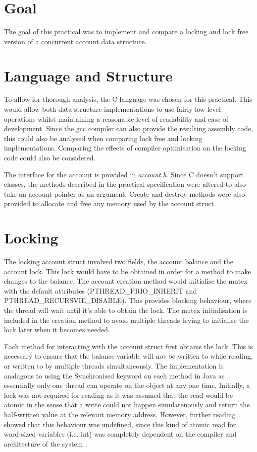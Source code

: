 \documentclass[12pt]{article}
\begin{document}
\part*{Goal}

The goal of this practical was to implement and compare a locking and lock free version of a concurrent account data structure.

\part{Language and Structure}

To allow for thorough analysis, the C language was chosen for this practical. This would allow both data structure implementations to use fairly low level operations whilst maintaining a reasonable level of readability and ease of development. Since the gcc compiler can also provide the resulting assembly code, this could also be analysed when comparing lock free and locking implementations. Comparing the effects of compiler optimisation on the locking code could also be considered. 

The interface for the account is provided in \emph{account.h}. Since C doesn't support classes, the methods described in the practical specification were altered to also take an account pointer as an argument. Create and destroy methods were also provided to allocate and free any memory used by the account struct.

\part{Locking}

The locking account struct involved two fields, the account balance and the account lock. This lock would have to be obtained in order for a method to make changes to the balance. The account creation method would initialise the mutex with the default attributes (PTHREAD\_PRIO\_INHERIT and PTHREAD\_RECURSVIE\_DISABLE). This provides blocking behaviour, where the thread will wait until it's able to obtain the lock. The mutex initialisation is included in the creation method to avoid multiple threads trying to initialise the lock later when it becomes needed.

Each method for interacting with the account struct first obtains the lock. This is necessary to ensure that the balance variable will not be written to while reading, or written to by multiple threads simultaneously. The implementation is analagous to using the Synchronised keyword on each method in Java as essentially only one thread can operate on the object at any one time. Initially, a lock was not required for reading as it was assumed that the read would be atomic in the sense that a write could not happen simulatenously and return the half-written value at the relevant memory address. However, further reading showed that this behaviour was undefined, since this kind of atomic read for word-sized variables (i.e. int) was completely dependent on the compiler and architecture of the system \cite{mutexAtomic}. 
\end{document}
